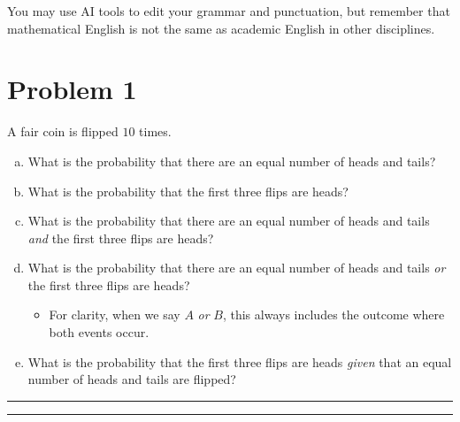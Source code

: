 \documentclass{article}
\theoremstyle{definition}
\newenvironment{solution}{\bigskip\hrule{\hfill}}{\bigskip\hrule{\hfill}} %
\begin{document}
You may use AI tools to edit your grammar and punctuation, but remember that mathematical English is not the same as academic English in other disciplines. 

\vfill

\newpage

\newpage


\section*{Problem 1}
A fair coin is flipped $10$ times.
\begin{enumerate}[a)] %
    \item What is the probability that there are an equal number of heads and tails?
    \item What is the probability that the first three flips are heads?
    \item What is the probability that there are an equal number of heads and tails \emph{and} the first three flips are heads?
    \item What is the probability that there are an equal number of heads and tails \emph{or} the first three flips are heads? 
    \begin{itemize}
        \item[] For clarity, when we say $A$ \emph{or} $B$, this always includes the outcome where both events occur.
    \end{itemize}
    \item What is the probability that the first three flips are heads \emph{given} that an equal number of heads and tails are flipped?
\end{enumerate}
\begin{solution}


\end{solution}


\newpage

\end{document}
